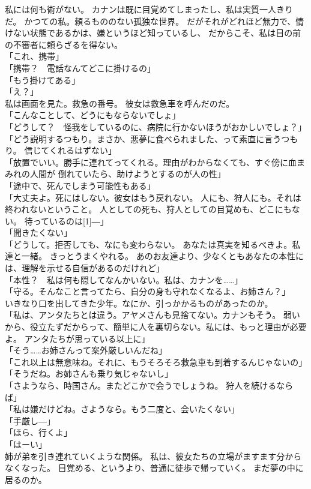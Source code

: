 \documentclass[../IHMain]{subfiles}
\begin{document}
私には何も術がない。
カナンは既に目覚めてしまったし、私は実質一人きりだ。
かつての私。頼るもののない孤独な世界。
だがそれがどれほど無力で、情けない状態であるかは、嫌というほど知っているし、
だからこそ、私は目の前の不審者に頼らざるを得ない。\\
「これ、携帯」\\
「携帯？　電話なんてどこに掛けるの」\\
「もう掛けてある」\\
「え？」\\
私は画面を見た。救急の番号。
彼女は救急車を呼んだのだ。\\
「こんなことして、どうにもならないでしょ」\\
「どうして？　怪我をしているのに、病院に行かないほうがおかしいでしょ？」\\
「どう説明するつもり。まさか、悪夢に食べられました、って素直に言うつもり。
信じてくれるはずない」\\
「放置でいい。勝手に連れてってくれる。理由がわからなくても、すぐ傍に血まみれの人間が
倒れていたら、助けようとするのが人の性」\\
「途中で、死んでしまう可能性もある」\\
「大丈夫よ。死にはしない。彼女はもう戻れない。
人にも、狩人にも。それは終われないということ。
人としての死も、狩人としての目覚めも、どこにもない。
待っているのは\scalebox{3}[1]{―}」\\
「聞きたくない」\\
「どうして。拒否しても、なにも変わらない。
あなたは真実を知るべきよ。私達と一緒。
きっとうまくやれる。
あのお友達より、少なくともあなたの本性には、理解を示せる自信があるのだけれど」\\
「本性？　私は何も隠してなんかいない。私は、カナンを……」\\
「守る。そんなこと言ってたら、自分の身も守れなくなるよ、お姉さん？」\\
いきなり口を出してきた少年。なにか、引っかかるものがあったのか。\\
「私は、アンタたちとは違う。アヤメさんも見捨てない。カナンもそう。
弱いから、役立たずだからって、簡単に人を裏切らない。私には、もっと理由が必要よ。
アンタたちが思っている以上に」\\
「そう……お姉さんって案外厳しいんだね」\\
「これ以上は無意味ね。それに、もうそろそろ救急車も到着するんじゃないの」\\
「そうだね。お姉さんも乗り気じゃないし」\\
「さようなら、時国さん。またどこかで会うでしょうね。
狩人を続けるならば」\\
「私は嫌だけどね。さようなら。もう二度と、会いたくない」\\
「手厳し―」\\
「ほら、行くよ」\\
「はーい」\\
姉が弟を引き連れていくような関係。
私は、彼女たちの立場がますます分からなくなった。
目覚める、というより、普通に徒歩で帰っていく。
まだ夢の中に居るのか。
\end{document}
